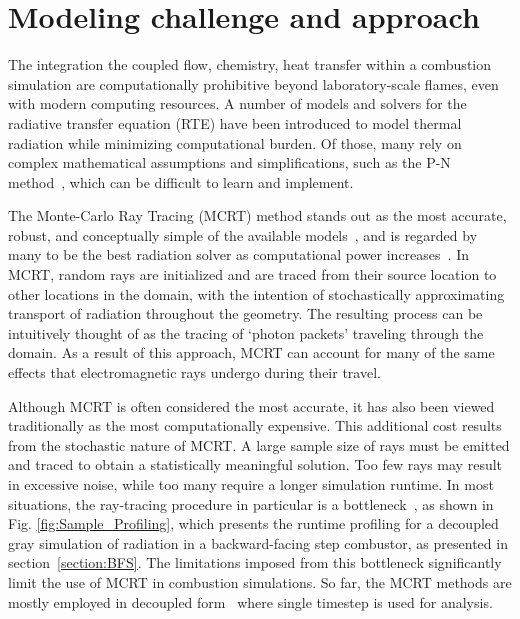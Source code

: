 

\section{Modeling challenge and approach}
The integration the coupled flow, chemistry, heat transfer within a combustion simulation are computationally prohibitive beyond laboratory-scale flames, even with modern computing resources.
A number of models and solvers for the radiative transfer equation (RTE) have been introduced to model thermal radiation while minimizing computational burden.
Of those, many rely on complex mathematical assumptions and simplifications, such as the P-N method~\cite{Ge2015ImplementationOpenfoam,Modest2008EllipticGeometries}, which can be difficult to learn and implement. 


The Monte-Carlo Ray Tracing (MCRT) method stands out as the most accurate, robust, and conceptually simple of the available models~\cite{Tesse2002RadiativeApproach,Modest2013RadiativeTransfer,Coelho2018RadiativeSystems}, and is regarded by many to be the best radiation solver as computational power increases~\cite{Howell2010ThermalTransfer}.
In MCRT, random rays are initialized and are traced from their source location to other locations in the domain, with the intention of stochastically approximating transport of radiation throughout the geometry.
The resulting process can be intuitively thought of as the tracing of `photon packets' traveling through the domain.
As a result of this approach, MCRT can account for many of the same effects that electromagnetic rays undergo during their travel.

Although MCRT is often considered the most accurate, it has also been viewed traditionally as the most computationally expensive.
This additional cost results from the stochastic nature of MCRT. A large sample size of rays must be emitted and traced to obtain a statistically meaningful solution. 
Too few rays may result in excessive noise, while too many require a longer simulation runtime. In most situations, the ray-tracing procedure in particular is a bottleneck~\cite{Galtier2013IntegralAlgorithms}, as shown in Fig. \ref{fig:Sample_Profiling}, which presents the runtime profiling for a decoupled gray simulation of radiation in a backward-facing step combustor, as presented in section~\ref{section:BFS}.
The limitations imposed from this bottleneck significantly limit the use of MCRT in combustion simulations. So far, the MCRT methods are mostly employed in decoupled form~\cite{Modest2022ChapterMedia} where single timestep is used for analysis. 

